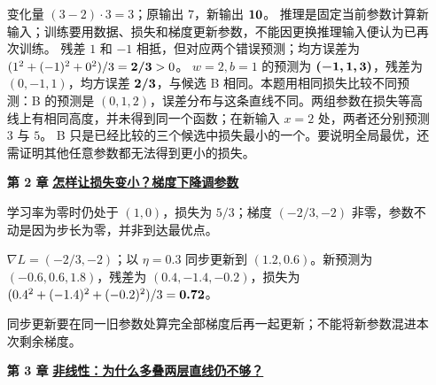 \begin{enumerate}[leftmargin=5.4em,labelsep=.7em,itemsep=9pt]
变化量 $(3-2)\cdot3=3$；原输出 $7$，新输出 $\answerresult{10}$。
推理是固定当前参数计算新输入；训练要用数据、损失和梯度更新参数，不能因更换推理输入便认为已再次训练。
残差 $1$ 和 $-1$ 相抵，但对应两个错误预测；均方误差为 $(1^2+(-1)^2+0^2)/3=\answerresult{2/3}>0$。
$w=2,b=1$ 的预测为 $\answerresult{(-1,1,3)}$，残差为 $(0,-1,1)$，均方误差 $\answerresult{2/3}$，与候选 B 相同。本题用相同损失比较不同预测：B 的预测是 $(0,1,2)$，误差分布与这条直线不同。两组参数在损失等高线上有相同高度，并未得到同一个函数；在新输入 $x=2$ 处，两者还分别预测 $3$ 与 $5$。
B 只是已经比较的三个候选中损失最小的一个。要说明全局最优，还需证明其他任意参数都无法得到更小的损失。
\par{}
\item[\textbf{第 2 章}] \label{answer:gradient-descent}\textbf{\hyperref[check:gradient-descent]{怎样让损失变小？梯度下降调参数}}\par\nobreak
学习率为零时仍处于 $(1,0)$，损失为 $5/3$；梯度 $(-2/3,-2)$ 非零，参数不动是因为步长为零，并非到达最优点。
\par{}$\nabla L=(-2/3,-2)$；以 $\eta=0.3$ 同步更新到 $(1.2,0.6)$。新预测为 $(-0.6,0.6,1.8)$，残差为 $(0.4,-1.4,-0.2)$，损失为 $(0.4^2+(-1.4)^2+(-0.2)^2)/3=\boldsymbol{0.72}$。
\par{}同步更新要在同一旧参数处算完全部梯度后再一起更新；不能将新参数混进本次剩余梯度。
\par{}
\item[\textbf{第 3 章}] \label{answer:nonlinearity}\textbf{\hyperref[check:nonlinearity]{非线性：为什么多叠两层直线仍不够？}}\par\nobreak

\end{enumerate}
